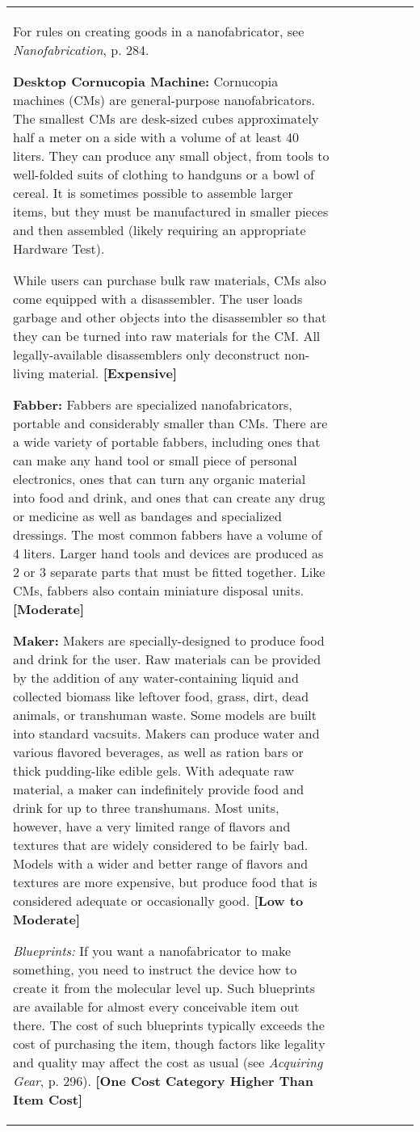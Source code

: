 \begin{tabular}{|l|l|l|l|l|l|l|}
For rules on creating goods in a nanofabricator, see \textit{Nanofabrication}, p. 284. 

\textbf{Desktop Cornucopia Machine:} Cornucopia machines (CMs) are general-purpose nanofabricators. The smallest CMs are desk-sized cubes approximately half a meter on a side with a volume of at least 40 liters. They can produce any small object, from tools to well-folded suits of clothing to handguns or a bowl of cereal. It is sometimes possible to assemble larger items, but they must be manufactured in smaller pieces and then assembled (likely requiring an appropriate Hardware Test). 

While users can purchase bulk raw materials, CMs also come equipped with a disassembler. The user loads garbage and other objects into the disassembler so that they can be turned into raw materials for the CM. All legally-available disassemblers only deconstruct non-living material. \textbf{[Expensive]} 

\textbf{Fabber:} Fabbers are specialized nanofabricators, portable and considerably smaller than CMs. There are a wide variety of portable fabbers, including ones that can make any hand tool or small piece of personal electronics, ones that can turn any organic material into food and drink, and ones that can create any drug or medicine as well as bandages and specialized dressings. The most common fabbers have a volume of 4 liters. Larger hand tools and devices are produced as 2 or 3 separate parts that must be fitted together. Like CMs, fabbers also contain miniature disposal units. \textbf{[Moderate]} 

\textbf{Maker:} Makers are specially-designed to produce food and drink for the user. Raw materials can be provided by the addition of any water-containing liquid and collected biomass like leftover food, grass, dirt, dead animals, or transhuman waste. Some models are built into standard vacsuits. Makers can produce water and various flavored beverages, as well as ration bars or thick pudding-like edible gels. With adequate raw material, a maker can indefinitely provide food and drink for up to three transhumans. Most units, however, have a very limited range of flavors and textures that are widely considered to be fairly bad. Models with a wider and better range of flavors and textures are more expensive, but produce food that is considered adequate or occasionally good. \textbf{[Low to Moderate]} 

\emph{Blueprints:} If you want a nanofabricator to make something, you need to instruct the device how to create it from the molecular level up. Such blueprints are available for almost every conceivable item out there. The cost of such blueprints typically exceeds the cost of purchasing the item, though factors like legality and quality may affect the cost as usual (see \emph{Acquiring Gear}, p. 296). \textbf{[One Cost Category Higher Than Item Cost]} 




\end{tabular}
